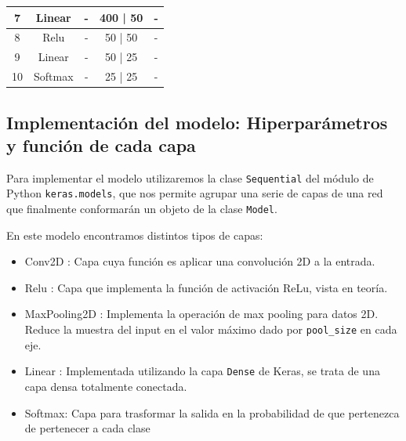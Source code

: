 \documentclass[12pt, spanish]{article}
\begin{document}
\begin{table}[H]
{\begin{tabular}{|c|c|c|c|c|}
7                       & Linear                & -                                                                                    & 400 | 50                          & -                                                                                                 \\ \hline
8                       & Relu                  & -                                                                                    & 50 | 50                           & -                                                                                                 \\ \hline
9                       & Linear                & -                                                                                    & 50 | 25                           & -                                                                                                 \\ \hline
10                      & Softmax               & -                                                                                    & 25 | 25                           & -                                                                                                 \\ \hline
\end{tabular}%
}
\end{table}


\subsection{Implementación del modelo: Hiperparámetros y función de cada capa}

Para implementar el modelo utilizaremos la clase \texttt{Sequential} del módulo de Python \texttt{keras.models}, que nos permite agrupar una serie de capas de una red que finalmente conformarán un objeto de la clase \texttt{Model}.

En este modelo encontramos distintos tipos de capas:

\begin{itemize}
	\item Conv2D\cite{conv2d} : Capa cuya función es aplicar una convolución 2D a la entrada.
	\item Relu\cite{relu} : Capa que implementa la función de activación ReLu, vista en teoría.
	\item MaxPooling2D\cite{maxpooling2d} : Implementa la operación de max pooling para datos 2D. Reduce la muestra del input en el valor máximo dado por \texttt{pool\_size} en cada eje.
	\item Linear : Implementada utilizando la capa \texttt{Dense}\cite{dense} de Keras, se trata de una capa densa totalmente conectada.
	\item Softmax\cite{softmax}: Capa para trasformar la salida en la probabilidad de que pertenezca de pertenecer a cada clase
\end{itemize}
\end{document}
